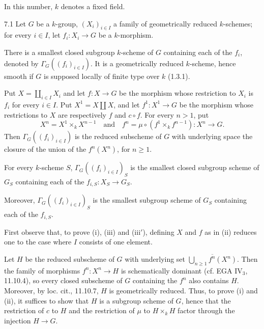 In this number, $k$ denotes a fixed field.
\begin{proposition}{7.1}\label{VIB.7.1}
Let $G$ be a $k$-group, $(X_i)_{i\in I}$ a family of geometrically reduced $k$-schemes; for every $i\in I$, let $f_i:X_i\to G$ be a $k$-morphism.
\begin{enumeratei}
\item There is a smallest closed subgroup $k$-scheme of $G$ containing each of the $f_i$, denoted by $\Gamma_G((f_i)_{i\in I})$. It is a geometrically reduced $k$-scheme, hence smooth if $G$ is supposed locally of finite type over $k$ (1.3.1).
\item Put $X=\coprod_{i\in I}X_i$ and let $f:X\to G$ be the morphism whose restriction to $X_i$ is $f_i$ for every $i\in I$. Put $X^1=X\coprod X$, and let $f^1:X^1\to G$ be the morphism whose restrictions to $X$ are respectively $f$ and $c\circ f$. For every $n>1$, put
\[
X^n=X^1\times_kX^{n-1}\quad\text{and}\quad f^n=\mu\circ(f^1\times_kf^{n-1}):X^n\longrightarrow G.
\]
Then $\Gamma_G((f_i)_{i\in I})$ is the reduced subscheme of $G$ with underlying space the closure of the union of the $f^n(X^n)$, for $n\ge1$.
\item For every $k$-scheme $S$, $\Gamma_G((f_i)_{i\in I})_S$ is the smallest closed subgroup scheme of $G_S$ containing each of the $f_{i,S}:X_S\to G_S$.
\item[(iii$'$)] Moreover, $\Gamma_G((f_i)_{i\in I})_S$ is the smallest subgroup scheme of $G_S$ containing each of the $f_{i,S}$.
\end{enumeratei}
\end{proposition}
First observe that, to prove (i), (iii) and (iii$'$), defining $X$ and $f$ as in (ii) reduces one to the case where $I$ consists of one element.

Let $H$ be the reduced subscheme of $G$ with underlying set $\overline{\bigcup_{n\ge1}f^n(X^n)}$. Then the family of morphisms $f^n:X^n\to H$ is schematically dominant (cf. EGA IV$_3$, 11.10.4), so every closed subscheme of $G$ containing the $f^n$ also contains $H$. Moreover, by loc. cit., 11.10.7, $H$ is geometrically reduced. Thus, to prove (i) and (ii), it suffices to show that $H$ is a subgroup scheme of $G$, hence that the restriction of $c$ to $H$ and the restriction of $\mu$ to $H\times_kH$ factor through the injection $H\to G$.

